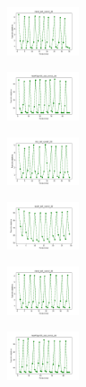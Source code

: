 \begin{figure}[H]
\begin{subfigure}
        \centering
        \includegraphics[width=0.234\textwidth]{img/ils-es/rand_set_const_20_277451237_cost.png}
    \end{subfigure}
    \hfill
    \begin{subfigure}
        \centering
        \includegraphics[width=0.234\textwidth]{img/ils-es/newthyroid_set_const_20_277451237_cost.png}
    \end{subfigure}
    \hfill
    \begin{subfigure}
        \centering
        \includegraphics[width=0.234\textwidth]{img/ils-es/iris_set_const_20_49258669_cost.png}
    \end{subfigure}
    \hfill
    \begin{subfigure}
        \centering
        \includegraphics[width=0.234\textwidth]{img/ils-es/ecoli_set_const_20_49258669_cost.png}
    \end{subfigure}
    \hfill
    \begin{subfigure}
        \centering
        \includegraphics[width=0.234\textwidth]{img/ils-es/rand_set_const_20_49258669_cost.png}
    \end{subfigure}
    \hfill
    \begin{subfigure}
        \centering
        \includegraphics[width=0.234\textwidth]{img/ils-es/newthyroid_set_const_20_49258669_cost.png}

\end{subfigure}
\end{figure}
